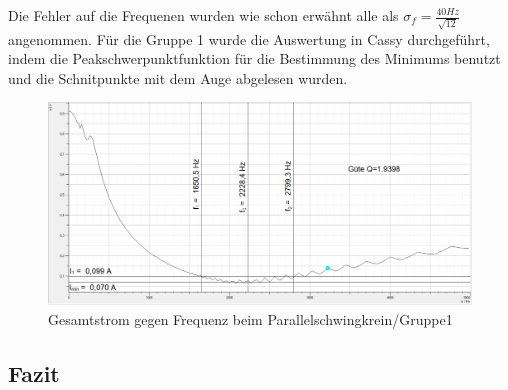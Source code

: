 \documentclass[a4paper, 11pt]{article}
\begin{document}
Die Fehler auf die Frequenen wurden wie schon erwähnt alle als $\sigma_f=\frac{40Hz}{\sqrt{12}}$ angenommen.
Für die Gruppe 1 wurde die Auswertung in Cassy durchgeführt, indem die Peakschwerpunktfunktion für die Bestimmung des Minimums benutzt und die Schnitpunkte mit dem Auge abgelesen wurden.

\begin{figure}[H]

	\hskip -2.0cm
	\includegraphics[trim = 0mm 0mm 0mm 0mm,clip, width=20cm]{Bilder/JOParallel47_Breite.png}%
	\caption[Gesamtstrom gegen Frequenz beim Parallelschwingkrein/Gruppe1]{Gesamtstrom gegen Frequenz beim Parallelschwingkrein/Gruppe1}%
	\label{pic:Abbildung 2}%

\end{figure}
\subsection{Fazit}
\end{document}
